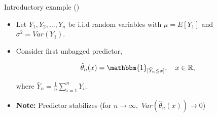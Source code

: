 \documentclass{beamer}
\begin{document}
\begin{frame}{Introductory example (\cite{Buhlmann2002})}
\begin{itemize}
\item Let $Y_{1}, Y_{2}, \dots, Y_{n}$ be i.i.d random variables with $\mu = E[Y_{1}]$ and $\sigma^{2} = Var(Y_{1})$.
\item Consider first unbagged predictor,

\begin{equation}\label{unbagged}
\hat{\theta}_{n}(x) = \mathbbm{1}_{[\bar{Y}_{n} \leq x]},\quad x\in  \mathbb{R},
\end{equation}

where $\bar{Y}_{n} = \frac{1}{n}\sum_{i=1}^{n}Y_{i}.$\\

\item \textbf{Note:} Predictor stabilizes (for $n \rightarrow \infty,$ $Var(\hat{\theta}_{n}(x)) \rightarrow 0$)

\end{itemize}

\end{frame}
\end{document}
